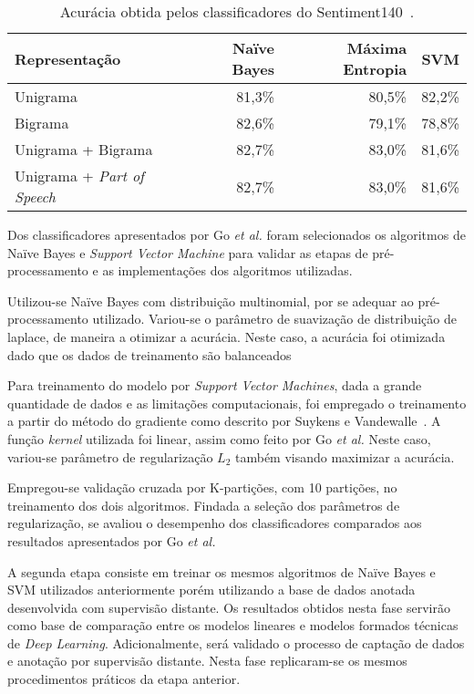 \begin{table}[h]
    \begin{center}
        \begin{tabular}{| l | r | r | r |}
        \hline
        \textbf{Representação} & \textbf{Naïve Bayes} & \textbf{Máxima Entropia} & \textbf{SVM} \\ \hline
        Unigrama & 81,3\% & 80,5\% & 82,2\% \\ \hline
        Bigrama &  82,6\% & 79,1\% & 78,8\% \\ \hline
        Unigrama + Bigrama & 82,7\% & 83,0\% & 81,6\% \\ \hline
        Unigrama + \textit{Part of Speech} & 82,7\% & 83,0\% & 81,6\% \\ \hline
        \end{tabular}
        \caption{Acurácia obtida pelos classificadores do Sentiment140~\cite{go09}.}
        \label{tab:go}
    \end{center}
\end{table}

Dos classificadores apresentados por Go \textit{et al.} foram selecionados os algoritmos de Naïve Bayes e
\textit{Support Vector Machine} para validar as etapas de pré-processamento e as implementações dos algoritmos
utilizadas.

Utilizou-se Naïve Bayes com distribuição multinomial, por se adequar ao pré-processamento utilizado.
Variou-se o parâmetro de suavização de distribuição de laplace, de maneira a otimizar a acurácia.
Neste caso, a acurácia foi otimizada dado que os dados de treinamento são balanceados

Para treinamento do modelo por \textit{Support Vector Machines}, dada a grande quantidade de dados e as limitações
computacionais, foi empregado o treinamento a partir do método do gradiente como descrito por Suykens e
Vandewalle~\cite{suykens99}.
A função \textit{kernel} utilizada foi linear, assim como feito por Go \textit{et al.}
Neste caso, variou-se parâmetro de regularização $L_{2}$ também visando maximizar a acurácia.

Empregou-se validação cruzada por K-partições, com 10 partições, no treinamento dos dois algoritmos.
Findada a seleção dos parâmetros de regularização, se avaliou o desempenho dos classificadores comparados aos resultados
apresentados por Go \textit{et al.}

A segunda etapa consiste em treinar os mesmos algoritmos de Naïve Bayes e SVM utilizados anteriormente porém utilizando
a base de dados anotada desenvolvida com supervisão distante.
Os resultados obtidos nesta fase servirão como base de comparação entre os modelos lineares e modelos formados técnicas
de \textit{Deep Learning}.
Adicionalmente, será validado o processo de captação de dados e anotação por supervisão distante.
Nesta fase replicaram-se os mesmos procedimentos práticos da etapa anterior.

